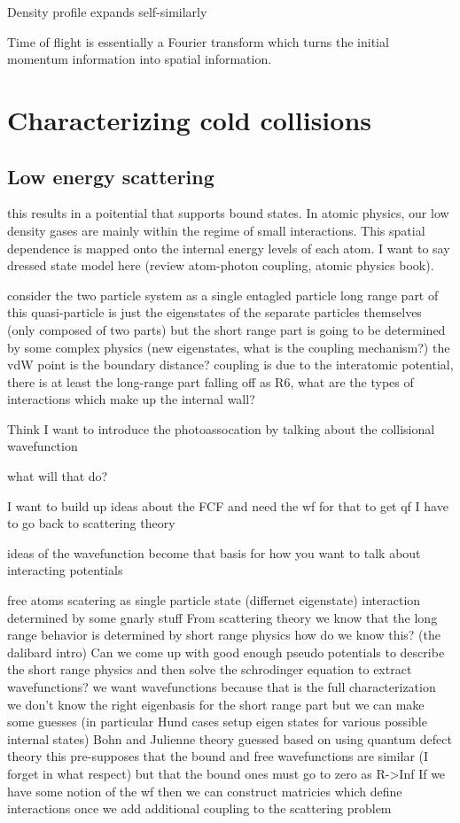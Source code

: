 Density profile expands self-similarly 

Time of flight is essentially a Fourier transform which turns the initial momentum information into spatial information.



\section{Characterizing cold collisions} \label{sec:cold_collisions}



\subsection{Low energy scattering} \label{ssec:scattering}

this results in a poitential that supports bound states. 
In atomic physics, our low density gases are mainly within the regime of small interactions. 
This spatial dependence is mapped onto the internal energy levels of each atom. I want to say dressed state model here (review atom-photon coupling, atomic physics book).

consider the two particle system as a single entagled particle
	long range part of this quasi-particle is just the eigenstates of the separate particles themselves (only composed of two parts)
	but the short range part is going to be determined by some complex physics (new eigenstates, what is the coupling mechanism?)
		the vdW point is the boundary distance?
		coupling is due to the interatomic potential, there is at least the long-range part falling off as R6, what are the types of interactions which make up the internal wall?


Think I want to introduce the photoassocation by talking about the collisional wavefunction

what will that do?

I want to build up ideas about the FCF and need the wf for that
	to get qf I have to go back to scattering theory

ideas of the wavefunction become that basis for how you want to talk about interacting potentials


free atoms
scatering as single particle state (differnet eigenstate)
	interaction determined by some gnarly stuff
From scattering theory we know that the long range behavior is determined by short range physics
	how do we know this? (the dalibard intro)
Can we come up with good enough pseudo potentials to describe the short range physics and then solve the schrodinger equation to extract wavefunctions?
	we want wavefunctions because that is the full characterization
	we don't know the right eigenbasis for the short range part but we can make some guesses (in particular Hund cases setup eigen states for various possible internal states)
	Bohn and Julienne theory guessed based on using quantum defect theory
		this pre-supposes that the bound and free wavefunctions are similar (I forget in what respect) but that the bound ones must go to zero as R->Inf
If we have some notion of the wf then we can construct matricies which define interactions once we add additional coupling to the scattering problem


